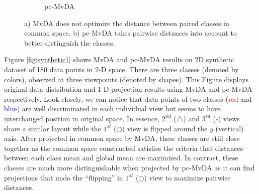\begin{figure}[htbp]
\begin{subfigure}{0.3\textwidth}
                \caption{pc-MvDA}
            \end{subfigure}

            \caption{a) MvDA does not optimize the distance between paired classes in common space. b) pc-MvDA takes pairwise distances into account to better distinguish the classes.}
            \label{fig:pc-MvDA}
        \end{figure}

        Figure \ref{fig:synthetic1} shows MvDA and pc-MvDA results on 2D synthetic dataset of 180 data points in 2-D space.
        There are three classes (denoted by colors), observed at three viewpoints (denoted by shapes).
        This Figure displays original data distribution and 1-D projection results using MvDA and pc-MvDA respectively.
        Look closely, we can notice that data points of two classes (\textcolor{red}{red} and \textcolor{blue}{blue}) are well discriminated in each individual view but seems to have interchanged position in original space.
        In essence, $2^{nd}$ ($\bigtriangleup$) and $3^{rd}$ ($\square$) views share a similar layout while the $1^{st}$ ($\bigcirc$) view is flipped around the $y$ (vertical) axis.
        After projected in common space by MvDA, these classes are still close together as the common space constructed satisfies the criteria that distances between each class mean and global mean are maximized.
        In contrast, these classes are much more distinguishable when projected by pc-MvDA as it can find projections that undo the ``flipping'' in $1^{st}$ ($\bigcirc$) view to maximize pairwise distances.

